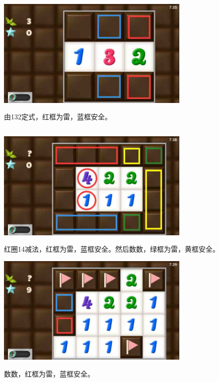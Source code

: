 \subsection{} %
\begin{center}
    \includegraphics[width=0.7\textwidth]{puzzlelow/8-1.jpg}
\end{center}
由132定式，红框为雷，蓝框安全。

\subsection{} %
\begin{center}
    \includegraphics[width=0.7\textwidth]{puzzlelow/9-1.jpg}
\end{center}
红圈14减法，红框为雷，蓝框安全。然后数数，绿框为雷，黄框安全。
\begin{center}
    \includegraphics[width=0.7\textwidth]{puzzlelow/9-2.jpg}
\end{center}
数数，红框为雷，蓝框安全。

